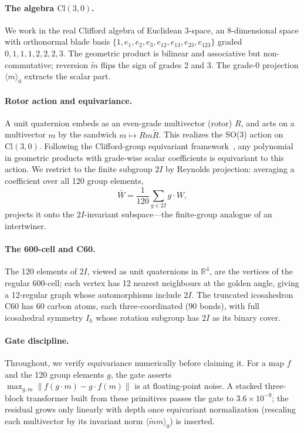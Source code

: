 \documentclass[10pt]{article}
\begin{document}
\paragraph{The algebra $\mathrm{Cl}(3,0)$.}
We work in the real Clifford algebra of Euclidean 3-space, an 8-dimensional space with orthonormal blade basis $\{1, e_1, e_2, e_3, e_{12}, e_{13}, e_{23}, e_{123}\}$ graded $0,1,1,1,2,2,2,3$.
The geometric product is bilinear and associative but non-commutative; reversion $\tilde{m}$ flips the sign of grades 2 and 3.
The grade-0 projection $\langle m\rangle_0$ extracts the scalar part.

\paragraph{Rotor action and equivariance.}
A unit quaternion embeds as an even-grade multivector (rotor) $R$, and acts on a multivector $m$ by the sandwich $m\mapsto Rm\tilde{R}$.
This realizes the SO(3) action on $\mathrm{Cl}(3,0)$.
Following the Clifford-group equivariant framework~\cite{ruhe2023}, any polynomial in geometric products with grade-wise scalar coefficients is equivariant to this action.
We restrict to the finite subgroup $2I$ by Reynolds projection: averaging a coefficient over all 120 group elements,
\[
\bar{W} = \frac{1}{120}\sum_{g\in 2I} g\cdot W,
\]
projects it onto the $2I$-invariant subspace---the finite-group analogue of an intertwiner.

\paragraph{The 600-cell and C60.}
The 120 elements of $2I$, viewed as unit quaternions in $\mathbb{R}^4$, are the vertices of the regular 600-cell; each vertex has 12 nearest neighbours at the golden angle, giving a 12-regular graph whose automorphisms include $2I$.
The truncated icosahedron C60 has 60 carbon atoms, each three-coordinated (90 bonds), with full icosahedral symmetry $I_h$ whose rotation subgroup has $2I$ as its binary cover.

\paragraph{Gate discipline.}
Throughout, we verify equivariance numerically before claiming it.
For a map $f$ and the 120 group elements $g$, the gate asserts $\max_{g,m}\|f(g\cdot m)-g\cdot f(m)\|$ is at floating-point noise.
A stacked three-block transformer built from these primitives passes the gate to $3.6\times 10^{-9}$; the residual grows only linearly with depth once equivariant normalization (rescaling each multivector by its invariant norm $\langle\tilde{m}m\rangle_0$) is inserted.
\end{document}
